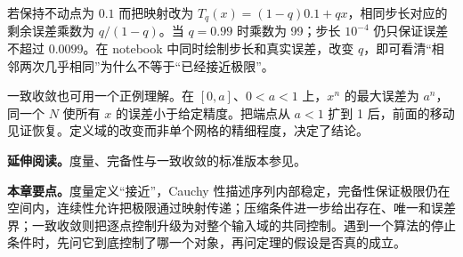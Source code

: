 若保持不动点为 $0.1$ 而把映射改为 $T_q(x)=(1-q)0.1+qx$，相同步长对应的剩余误差乘数为 $q/(1-q)$。当 $q=0.99$ 时乘数为 99；步长 $10^{-4}$ 仍只保证误差不超过 $0.0099$。在 notebook 中同时绘制步长和真实误差，改变 $q$，即可看清“相邻两次几乎相同”为什么不等于“已经接近极限”。

一致收敛也可用一个正例理解。在 $[0,a]$、$0<a<1$ 上，$x^n$ 的最大误差为 $a^n$，同一个 $N$ 使所有 $x$ 的误差小于给定精度。把端点从 $a<1$ 扩到 1 后，前面的移动见证恢复。定义域的改变而非单个网格的精细程度，决定了结论。

\noindent\textbf{延伸阅读。}度量、完备性与一致收敛的标准版本参见\cite{rudin1976analysis}。




\noindent\textbf{本章要点。}度量定义“接近”，Cauchy 性描述序列内部稳定，完备性保证极限仍在空间内，连续性允许把极限通过映射传递；压缩条件进一步给出存在、唯一和误差界；一致收敛则把逐点控制升级为对整个输入域的共同控制。遇到一个算法的停止条件时，先问它到底控制了哪一个对象，再问定理的假设是否真的成立。
